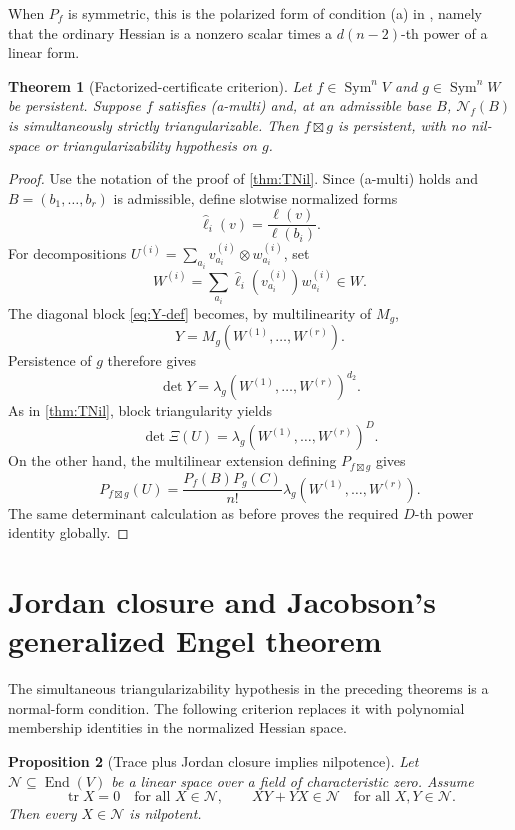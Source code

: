 \documentclass[11pt]{amsart}
\newtheorem{theorem}{Theorem}[section]
\newtheorem{proposition}[theorem]{Proposition}
\newcommand{\Sym}{\operatorname{Sym}}
\newcommand{\End}{\operatorname{End}}
\newcommand{\tr}{\operatorname{tr}}
\newcommand{\boxt}{\mathbin{\boxtimes}}
\newcommand{\Nsp}{\mathcal N}
\begin{document}
When $P_f$ is symmetric, this is the polarized form of condition (a) in
\cite{GO25}, namely that the ordinary Hessian is a nonzero scalar times a
$d(n-2)$-th power of a linear form.

\begin{theorem}[Factorized-certificate criterion]\label{thm:factorized}
Let $f\in\Sym^nV$ and $g\in\Sym^nW$ be persistent.  Suppose $f$ satisfies
(a-multi) and, at an admissible base $B$, $\Nsp_f(B)$ is simultaneously
strictly triangularizable.  Then $f\boxt g$ is persistent, with no nil-space or
triangularizability hypothesis on $g$.
\end{theorem}

\begin{proof}
Use the notation of the proof of \cref{thm:TNil}.  Since (a-multi) holds and
$B=(b_1,\ldots,b_r)$ is admissible, define slotwise normalized forms
\[
 \widehat\ell_i(v)=\frac{\ell(v)}{\ell(b_i)}.
\]
For decompositions
$U^{(i)}=\sum_{a_i}v^{(i)}_{a_i}\otimes w^{(i)}_{a_i}$, set
\begin{equation}\label{eq:Wi}
 W^{(i)}=\sum_{a_i}\widehat\ell_i(v^{(i)}_{a_i})w^{(i)}_{a_i}\in W.
\end{equation}
The diagonal block \eqref{eq:Y-def} becomes, by multilinearity of $M_g$,
\[
 Y=M_g(W^{(1)},\ldots,W^{(r)}).
\]
Persistence of $g$ therefore gives
\[
 \det Y=\lambda_g(W^{(1)},\ldots,W^{(r)})^{d_2}.
\]
As in \cref{thm:TNil}, block triangularity yields
\[
 \det\Xi(U)=\lambda_g(W^{(1)},\ldots,W^{(r)})^D.
\]
On the other hand, the multilinear extension defining $P_{f\boxt g}$ gives
\[
 P_{f\boxt g}(U)
 =\frac{P_f(B)P_g(C)}{n!}
   \lambda_g(W^{(1)},\ldots,W^{(r)}).
\]
The same determinant calculation as before proves the required $D$-th power
identity globally.
\end{proof}

\section{Jordan closure and Jacobson's generalized Engel theorem}

The simultaneous triangularizability hypothesis in the preceding theorems is a
normal-form condition.  The following criterion replaces it with polynomial
membership identities in the normalized Hessian space.

\begin{proposition}[Trace plus Jordan closure implies nilpotence]
\label{prop:TRJCNil}
Let $\Nsp\subseteq\End(V)$ be a linear space over a field of characteristic
zero.  Assume
\[
 \tr X=0\quad\text{for all }X\in\Nsp,
 \qquad
 XY+YX\in\Nsp\quad\text{for all }X,Y\in\Nsp.
\]
Then every $X\in\Nsp$ is nilpotent.
\end{proposition}
\end{document}
